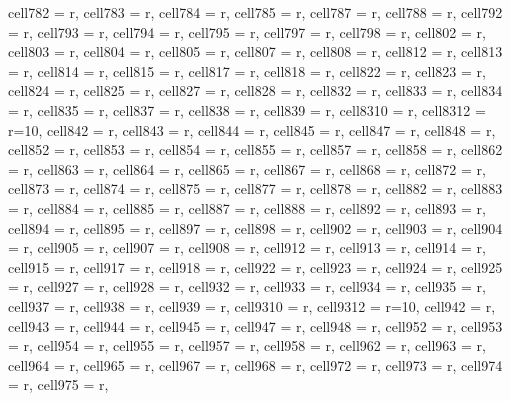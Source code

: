 \begin{longtblr}[
  caption = {Linear model estimating all the considered metrics in every alternative scenario.}
]
{  cell{78}{2} = {r},
  cell{78}{3} = {r},
  cell{78}{4} = {r},
  cell{78}{5} = {r},
  cell{78}{7} = {r},
  cell{78}{8} = {r},
  cell{79}{2} = {r},
  cell{79}{3} = {r},
  cell{79}{4} = {r},
  cell{79}{5} = {r},
  cell{79}{7} = {r},
  cell{79}{8} = {r},
  cell{80}{2} = {r},
  cell{80}{3} = {r},
  cell{80}{4} = {r},
  cell{80}{5} = {r},
  cell{80}{7} = {r},
  cell{80}{8} = {r},
  cell{81}{2} = {r},
  cell{81}{3} = {r},
  cell{81}{4} = {r},
  cell{81}{5} = {r},
  cell{81}{7} = {r},
  cell{81}{8} = {r},
  cell{82}{2} = {r},
  cell{82}{3} = {r},
  cell{82}{4} = {r},
  cell{82}{5} = {r},
  cell{82}{7} = {r},
  cell{82}{8} = {r},
  cell{83}{2} = {r},
  cell{83}{3} = {r},
  cell{83}{4} = {r},
  cell{83}{5} = {r},
  cell{83}{7} = {r},
  cell{83}{8} = {r},
  cell{83}{9} = {r},
  cell{83}{10} = {r},
  cell{83}{12} = {r=10}{},
  cell{84}{2} = {r},
  cell{84}{3} = {r},
  cell{84}{4} = {r},
  cell{84}{5} = {r},
  cell{84}{7} = {r},
  cell{84}{8} = {r},
  cell{85}{2} = {r},
  cell{85}{3} = {r},
  cell{85}{4} = {r},
  cell{85}{5} = {r},
  cell{85}{7} = {r},
  cell{85}{8} = {r},
  cell{86}{2} = {r},
  cell{86}{3} = {r},
  cell{86}{4} = {r},
  cell{86}{5} = {r},
  cell{86}{7} = {r},
  cell{86}{8} = {r},
  cell{87}{2} = {r},
  cell{87}{3} = {r},
  cell{87}{4} = {r},
  cell{87}{5} = {r},
  cell{87}{7} = {r},
  cell{87}{8} = {r},
  cell{88}{2} = {r},
  cell{88}{3} = {r},
  cell{88}{4} = {r},
  cell{88}{5} = {r},
  cell{88}{7} = {r},
  cell{88}{8} = {r},
  cell{89}{2} = {r},
  cell{89}{3} = {r},
  cell{89}{4} = {r},
  cell{89}{5} = {r},
  cell{89}{7} = {r},
  cell{89}{8} = {r},
  cell{90}{2} = {r},
  cell{90}{3} = {r},
  cell{90}{4} = {r},
  cell{90}{5} = {r},
  cell{90}{7} = {r},
  cell{90}{8} = {r},
  cell{91}{2} = {r},
  cell{91}{3} = {r},
  cell{91}{4} = {r},
  cell{91}{5} = {r},
  cell{91}{7} = {r},
  cell{91}{8} = {r},
  cell{92}{2} = {r},
  cell{92}{3} = {r},
  cell{92}{4} = {r},
  cell{92}{5} = {r},
  cell{92}{7} = {r},
  cell{92}{8} = {r},
  cell{93}{2} = {r},
  cell{93}{3} = {r},
  cell{93}{4} = {r},
  cell{93}{5} = {r},
  cell{93}{7} = {r},
  cell{93}{8} = {r},
  cell{93}{9} = {r},
  cell{93}{10} = {r},
  cell{93}{12} = {r=10}{},
  cell{94}{2} = {r},
  cell{94}{3} = {r},
  cell{94}{4} = {r},
  cell{94}{5} = {r},
  cell{94}{7} = {r},
  cell{94}{8} = {r},
  cell{95}{2} = {r},
  cell{95}{3} = {r},
  cell{95}{4} = {r},
  cell{95}{5} = {r},
  cell{95}{7} = {r},
  cell{95}{8} = {r},
  cell{96}{2} = {r},
  cell{96}{3} = {r},
  cell{96}{4} = {r},
  cell{96}{5} = {r},
  cell{96}{7} = {r},
  cell{96}{8} = {r},
  cell{97}{2} = {r},
  cell{97}{3} = {r},
  cell{97}{4} = {r},
  cell{97}{5} = {r},
}
\end{longtblr}
